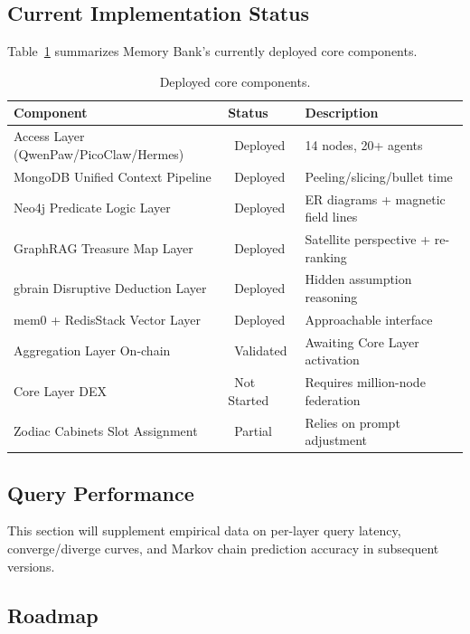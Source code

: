 \documentclass[11pt,a4paper]{article}
\newcommand{\cmark}{\ding{51}}%
\newcommand{\xmark}{\ding{55}}%
\newcommand{\warn}{\raisebox{0.2ex}{\textbf{!}}}
\begin{document}
\subsection{Current Implementation Status}
\label{sub:status}

Table~\ref{tab:components} summarizes Memory Bank's currently deployed core components.

\begin{table}[ht]
\centering
\caption{Deployed core components.}
\label{tab:components}
\small
\begin{tabular}{@{}llp{5.5cm}@{}}
\toprule
\textbf{Component} & \textbf{Status} & \textbf{Description} \\
\midrule
Access Layer (QwenPaw/PicoClaw/Hermes) & \cmark\ Deployed & 14 nodes, 20+ agents \\
MongoDB Unified Context Pipeline & \cmark\ Deployed & Peeling/slicing/bullet time \\
Neo4j Predicate Logic Layer & \cmark\ Deployed & ER diagrams + magnetic field lines \\
GraphRAG Treasure Map Layer & \cmark\ Deployed & Satellite perspective + re-ranking \\
gbrain Disruptive Deduction Layer & \cmark\ Deployed & Hidden assumption reasoning \\
mem0 + RedisStack Vector Layer & \cmark\ Deployed & Approachable interface \\
Aggregation Layer On-chain & \warn\ Validated & Awaiting Core Layer activation \\
Core Layer DEX & \xmark\ Not Started & Requires million-node federation \\
Zodiac Cabinets Slot Assignment & \warn\ Partial & Relies on prompt adjustment \\
\bottomrule
\end{tabular}
\end{table}

\subsection{Query Performance}
\label{sub:performance}

This section will supplement empirical data on per-layer query latency, converge/diverge curves, and Markov chain prediction accuracy in subsequent versions.

\subsection{Roadmap}
\label{sub:roadmap}
\end{document}
